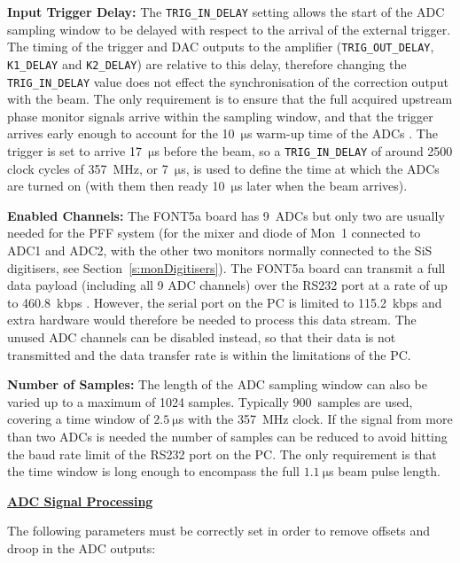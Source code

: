 \textbf{Input Trigger Delay:} The \texttt{TRIG\_IN\_DELAY} setting allows the start of the ADC sampling window to be delayed with respect to the arrival of the external trigger. The timing of the trigger and DAC outputs to the amplifier (\texttt{TRIG\_OUT\_DELAY},  \texttt{K1\_DELAY} and \texttt{K2\_DELAY}) are relative to this delay, therefore changing the \texttt{TRIG\_IN\_DELAY} value does not effect the synchronisation of the correction output with the beam. The only requirement is to ensure that the full acquired upstream phase monitor signals arrive within the sampling window, and that the trigger arrives early enough to account for the 10~\(\mathrm{\mu}\)s warm-up time of the ADCs \cite{glennPriv}. The trigger is set to arrive 17~\(\mathrm{\mu}\)s before the beam, so a \texttt{TRIG\_IN\_DELAY} of around 2500 clock cycles of 357~MHz, or 7~\(\mathrm{\mu}\)s, is used to define the time at which the ADCs are turned on (with them then ready 10~\(\mathrm{\mu}\)s later when the beam arrives).

\textbf{Enabled Channels:} The FONT5a board has 9~ADCs but only two are usually needed for the PFF system (for the mixer and diode of Mon~1 connected to ADC1 and ADC2, with the other two monitors normally connected to the SiS digitisers, see Section~\ref{s:monDigitisers}). 
The FONT5a board can transmit a full data payload (including all 9 ADC channels) over the RS232 port at a rate of up to 460.8~kbps \cite{glennPriv}. However, the serial port on the PC is limited to 115.2~kbps and extra hardware would therefore be needed to process this data stream.
The unused ADC channels can be disabled instead, so that their data is not transmitted and the data transfer rate is within the limitations of the PC.

\textbf{Number of Samples:} The length of the ADC sampling window can also be varied up to a maximum of 1024 samples. Typically 900~samples are used, covering a time window of \(2.5~\mathrm{\mu}\)s with the 357~MHz clock. If the signal from more than two ADCs is needed the number of samples can be reduced to avoid hitting the baud rate limit of the RS232 port on the PC. The only requirement is that the time window is long enough to encompass the full \(1.1~\mathrm{\mu}\)s beam pulse length.

\vspace{0.2cm}
\noindent\underline{\textbf{ADC Signal Processing}}

\noindent The following parameters must be correctly set in order to remove offsets and droop in the ADC outputs:

